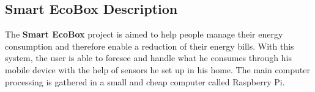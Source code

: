 
\subsection{Smart EcoBox Description}
%
%


The \textbf{Smart EcoBox} project is aimed to help people manage their energy consumption and therefore enable a reduction of their energy bills. With this system, the user is able to foresee and handle what he consumes through his mobile device with the help of sensors he set up in his home. The main computer processing is gathered in a small and cheap computer called Raspberry Pi.


